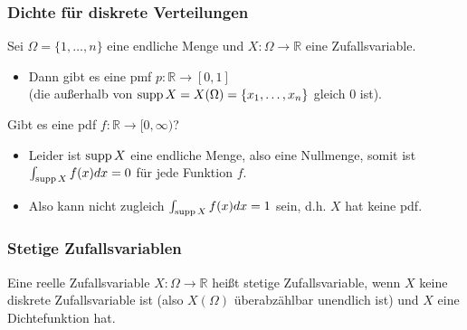 \begin{frame}
  \frametitle{Dichte für diskrete Verteilungen}
  Sei $\Omega = \{1,\dots,n\}$ eine endliche Menge und $X \colon \Omega \to \mathbb{R}$ eine Zufallsvariable.
  \begin{itemize}
  \item Dann gibt es eine pmf $p \colon \mathbb{R} \to [0,1]$ \\\pause
  (die außerhalb von $\operatorname{supp} X = X(\Omega) = \{x_1,\dots,x_n\}$ gleich $0$ ist).\pause
  \end{itemize}
  \medskip
  
  Gibt es eine pdf $f \colon \mathbb{R} \to [0,\infty)$?\pause
  \begin{itemize}
  \item Leider ist $\operatorname{supp} X$ eine endliche Menge, also eine Nullmenge, somit ist $\int_{\operatorname{supp} X} f(x) dx = 0$ für jede Funktion $f$.\smallskip\pause
  \item Also kann nicht zugleich $\int_{\operatorname{supp} X} f(x) dx = 1$ sein, d.h. $X$ hat keine pdf.
  \end{itemize}
\end{frame}

\begin{frame}
  \frametitle{Stetige Zufallsvariablen}
  \begin{definition}
    Eine reelle Zufallsvariable $X \colon \Omega \to \mathbb{R}$ heißt \alert{stetige Zufallsvariable},
    wenn $X$ keine diskrete Zufallsvariable ist (also $X(\Omega)$ überabzählbar unendlich ist) und $X$ eine \alert{Dichtefunktion} hat.
  \end{definition}
\end{frame}





